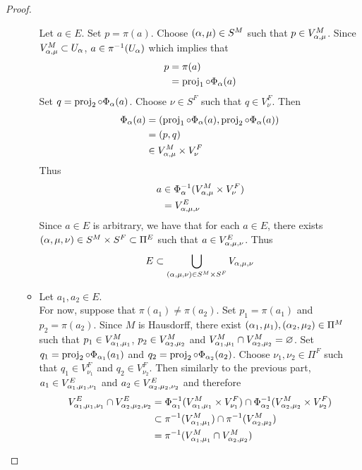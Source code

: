 \documentclass{book}
\begin{document}
\begin{proof}
\begin{enumerate}
\begin{itemize}
				Let $a \in E$. Set $p = \pi(a)$. Choose $(\alpha, \mu) \in S^M$ such that $p \in V_{\alpha, \mu}^M$. Since $V^M_{\alpha, \mu} \subset U_{\alpha}$, $a \in \pi^{-1}(U_{\alpha})$ which implies that
				\begin{align*}
					p
					& = \pi(a) \\
					& = \operatorname{\text{proj}}_1 \circ \Phi_{\alpha}(a)
				\end{align*}
				Set $q = \operatorname{\text{proj}}_2 \circ \Phi_{\alpha}(a)$. Choose $\nu \in S^F$ such that $q \in V^F_{\nu}$. Then 
				\begin{align*}
					\Phi_{\alpha}(a)
					& = (\operatorname{\text{proj}}_1 \circ \Phi_{\alpha}(a), \operatorname{\text{proj}}_2 \circ \Phi_{\alpha}(a)) \\
					& = (p, q) \\
					& \in V_{\alpha, \mu}^M \times V_{\nu}^F
				\end{align*}
				Thus 
				\begin{align*}
					a 
					& \in \Phi^{-1}_{\alpha}(V_{\alpha, \mu}^M \times V_{\nu}^F) \\
					& = V^E_{\alpha, \mu, \nu} 
				\end{align*}
				Since $a \in E$ is arbitrary, we have that for each $a \in E$, there exists $(\alpha, \mu, \nu) \in S^M \times S^F \subset \Pi^E$ such that $a \in V^E_{\alpha, \mu, \nu}$. Thus 
				$$E \subset \bigcup_{(\alpha, \mu, \nu) \in S^M \times S^F} V_{\alpha, \mu, \nu}$$
				\item Let $a_1, a_2 \in E$. \\
				For now, suppose that $\pi(a_1) \neq \pi(a_2)$. Set $p_1 = \pi(a_1)$ and $p_2 = \pi(a_2)$. Since $M$ is Hausdorff, there exist $(\alpha_1, \mu_1), (\alpha_2, \mu_2) \in \Pi^M$ such that $p_1 \in V^M_{\alpha_1, \mu_1}$, $p_2 \in V^M_{\alpha_2, \mu_2}$ and $V^M_{\alpha_1, \mu_1} \cap V^M_{\alpha_2, \mu_2} = \varnothing$. Set $q_1 = \operatorname{\text{proj}}_2 \circ \Phi_{\alpha_1}(a_1)$ and  $q_2 = \operatorname{\text{proj}}_2 \circ \Phi_{\alpha_2}(a_2)$. Choose $\nu_1, \nu_2 \in \Pi^F$ such that $q_1 \in V^F_{\nu_1}$ and $q_2 \in V^F_{\nu_2}$. Then similarly to the previous part, $a_1 \in V^E_{\alpha_1, \mu_1, \nu_1}$ and $a_2 \in V^E_{\alpha_2, \mu_2, \nu_2}$ and therefore
				\begin{align*}
					V^E_{\al_1, \mu_1, \nu_1} \cap V^E_{\al_2, \mu_2, \nu_2}
					& = \Phi_{\al_1}^{-1}(V^M_{\al_1, \mu_1} \times V^F_{\nu_1}) \cap \Phi_{\al_2}^{-1}(V^M_{\al_2, \mu_2} \times V^F_{\nu_2}) \\
					& \subset \pi^{-1}(V^M_{\al_1, \mu_1}) \cap \pi^{-1}(V^M_{\al_2, \mu_2}) \\
					& = \pi^{-1}(V^M_{\al_1, \mu_1} \cap V^M_{\al_2, \mu_2}) \\

\end{align*}
\end{itemize}
\end{enumerate}
\end{proof}
\end{document}
